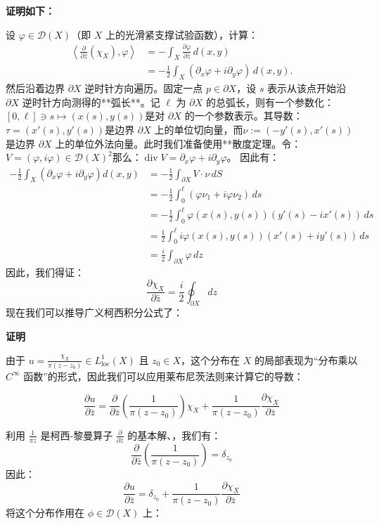\textbf{证明如下：}

设 $\varphi \in \mathcal{D}(X)$（即 $X$ 上的光滑紧支撑试验函数），计算：
$$
\begin{aligned}
\left\langle \frac{\partial}{\partial \bar{z}}(\chi_X), \varphi \right\rangle &= -\int_X \frac{\partial \varphi}{\partial \bar{z}}\, d(x,y) \\
&= -\frac{1}{2} \int_X \left( \partial_x \varphi + i \partial_y \varphi \right)\, d(x,y).
\end{aligned}~
$$
然后沿着边界 $\partial X$ 逆时针方向遍历。固定一点 $p \in \partial X$，设 $s$ 表示从该点开始沿 $\partial X$ 逆时针方向测得的**弧长**。记 $\ell$ 为 $\partial X$ 的总弧长，则有一个参数化：$[0, \ell] \ni s \mapsto (x(s), y(s))$是对 $\partial X$ 的一个参数表示。其导数：$\tau = \left( x'(s), y'(s) \right)$是边界 $\partial X$ 上的单位切向量，而$\nu := \left( -y'(s), x'(s) \right)$是边界 $\partial X$ 上的单位外法向量。此时我们准备使用**散度定理。令：$V = (\varphi, i\varphi) \in \mathcal{D}(X)^2$那么：$\operatorname{div} V = \partial_x \varphi + i \partial_y \varphi$。
因此有：
$$
\begin{aligned}
-\frac{1}{2} \int_X \left( \partial_x \varphi + i \partial_y \varphi \right) d(x,y)
&= -\frac{1}{2} \int_{\partial X} V \cdot \nu\, dS \\
&= -\frac{1}{2} \int_0^{\ell} \left( \varphi \nu_1 + i \varphi \nu_2 \right)\, ds \\
&= -\frac{1}{2} \int_0^{\ell} \varphi(x(s), y(s)) \left( y'(s) - i x'(s) \right)\, ds \\
&= \frac{1}{2} \int_0^{\ell} i \varphi(x(s), y(s)) \left( x'(s) + i y'(s) \right)\, ds \\
&= \frac{i}{2} \int_{\partial X} \varphi\, dz
\end{aligned}~
$$
因此，我们得证：
$$
\frac{\partial \chi_X}{\partial \bar{z}} = \frac{i}{2} \oint_{\partial X} dz~
$$
现在我们可以推导广义柯西积分公式了：

\textbf{证明}

由于
$u = \frac{\chi_X}{\pi(z - z_0)} \in L_{\text{loc}}^1(X)$
且 $z_0 \in X$，这个分布在 $X$ 的局部表现为“分布乘以 $C^\infty$ 函数”的形式，因此我们可以应用莱布尼茨法则来计算它的导数：

$$
\frac{\partial u}{\partial \bar{z}} = \frac{\partial}{\partial \bar{z}}\left( \frac{1}{\pi(z - z_0)} \right) \chi_X + \frac{1}{\pi(z - z_0)} \frac{\partial \chi_X}{\partial \bar{z}}~
$$

利用 $\frac{1}{\pi z}$ 是柯西-黎曼算子 $\frac{\partial}{\partial \bar{z}}$ 的基本解、，我们有：
$$
\frac{\partial}{\partial \bar{z}}\left( \frac{1}{\pi(z - z_0)} \right) = \delta_{z_0}~
$$
因此：
$$
\frac{\partial u}{\partial \bar{z}} = \delta_{z_0} + \frac{1}{\pi(z - z_0)} \frac{\partial \chi_X}{\partial \bar{z}}~
$$
将这个分布作用在 $\phi \in \mathcal{D}(X)$ 上：

